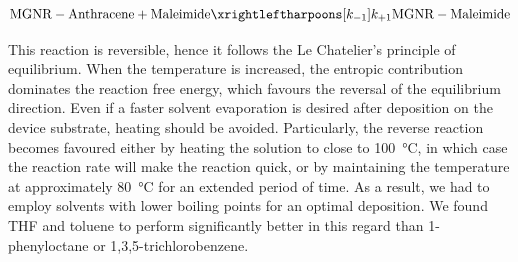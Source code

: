 \begin{equation}
    \label{eq:absorption}
    \textrm{MGNR}-\textrm{Anthracene} + \textrm{Maleimide} \xrightleftharpoons[k_{-1}]{k_{+1}} \textrm{MGNR}-\textrm{Maleimide}
\end{equation}


This reaction is reversible, hence it follows the Le Chatelier's principle of equilibrium. When the temperature is increased, the entropic contribution dominates the reaction free energy, which favours the reversal of the equilibrium direction. Even if a faster solvent evaporation is desired after deposition on the device substrate, heating should be avoided. Particularly, the reverse reaction becomes favoured either by heating the solution to close to \SI{100}{\degreeCelsius}, in which case the reaction rate will make the reaction quick, or by maintaining the temperature at approximately \SI{80}{\degreeCelsius} for an extended period of time. As a result, we had to employ solvents with lower boiling points for an optimal deposition. We found THF and toluene to perform significantly better in this regard than 1-phenyloctane or 1,3,5-trichlorobenzene.
